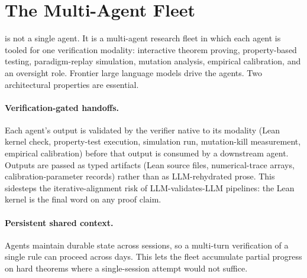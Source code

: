 \section{The \sys{} Multi-Agent Fleet}
\label{sec:methods}

\sys{} is not a single agent. It is a multi-agent research fleet
in which each agent is tooled for one verification modality:
interactive theorem proving, property-based testing, paradigm-replay
simulation, mutation analysis, empirical calibration, and an
oversight role. Frontier large language models drive the agents.
Two architectural properties are essential.

\paragraph{Verification-gated handoffs.}
Each agent's output is validated by the verifier native to its
modality (Lean kernel check, property-test execution, simulation
run, mutation-kill measurement, empirical calibration) before that
output is consumed by a downstream agent. Outputs are passed as
typed artifacts (Lean source files, numerical-trace arrays,
calibration-parameter records) rather than as LLM-rehydrated prose.
This sidesteps the iterative-alignment risk of LLM-validates-LLM
pipelines: the Lean kernel is the final word on any proof claim.

\paragraph{Persistent shared context.}
Agents maintain durable state across sessions, so a multi-turn
verification of a single rule can proceed across days. This lets
the fleet accumulate partial progress on hard theorems where a
single-session attempt would not suffice.

